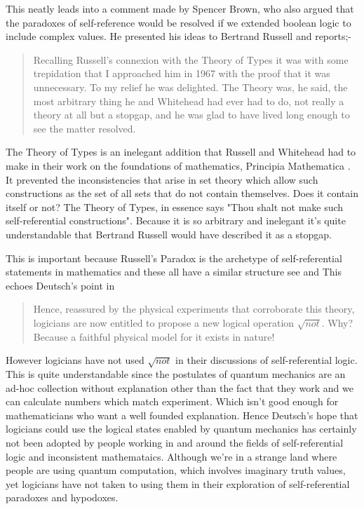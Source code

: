 \documentclass{article}
\begin{document}
This neatly leads into a comment made by Spencer Brown, who also argued that the paradoxes of self-reference would be resolved if we extended boolean logic to include complex values. He presented his ideas to Bertrand Russell and reports;-
\begin{quotation}
    Recalling Russell's connexion with the Theory of Types it was with some trepidation that I approached him in 1967 with the proof that it was unnecessary. To my relief he was delighted. The Theory was, he said, the most arbitrary thing he and Whitehead had ever had to do, not really a theory at all but a stopgap, and he was glad to have lived long enough to see the matter resolved. 
    \hfill \autocite[ix]{Spence-Brown-1969}
\end{quotation}
The Theory of Types is an inelegant addition that Russell and Whitehead had to make in their work on the foundations of mathematics, Principia Mathematica \autocite{russell_2010}. It prevented the inconsistencies that arise in  set theory which allow such constructions as the set of all sets that do not contain themselves. Does it contain itself or not? The Theory of Types, in essence says "Thou shalt not make such self-referential constructions". Because it is so arbitrary and inelegant it's quite understandable that Bertrand Russell would have described it as a stopgap. 

This is important because Russell's Paradox is the archetype of self-referential statements in mathematics and these all have a similar structure see \autocite{Lawvere1969DiagonalCategories} and \autocite{Yanofsky2003} This echoes Deutsch's point in \autocite{deutsch_1999} 
\begin{quotation}
    Hence, reassured by the physical experiments that corroborate this theory, logicians are now entitled to propose a new logical operation $\sqrt{not}$. Why? Because a faithful physical model for it exists in nature!
\end{quotation}
However logicians have not used $\sqrt{not}$ in their discussions of self-referential logic. This is quite understandable since the postulates of quantum mechanics are an ad-hoc collection without explanation other than the fact that they work and we can calculate numbers which match experiment. Which isn't good enough for mathematicians who want a well founded explanation. Hence Deutsch's hope that logicians could use the logical states enabled by quantum mechanics has certainly not been adopted by people working in and around the fields of self-referential logic and inconsistent mathemataics. Although we're in a strange land where people are using quantum computation, which involves imaginary truth values, yet logicians have not taken to using them in their exploration of self-referential paradoxes and hypodoxes. 
\end{document}
